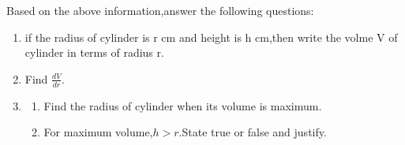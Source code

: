\documentclass{article}
\begin{document}
\begin{enumerate}
		Based on the above information,answer the following questions:\\
		
			\begin{enumerate}
				\item if the radius of cylinder is r cm and height is h cm,then write the volme V of cylinder in terms of radius r.
					
				\item Find $ \frac{dV}{dr} $.
					
				\item \begin{enumerate}
						\item Find the radius of cylinder when its volume is maximum.
			
		\item For maximum volume,$h>r$.State true or false and justify.
				
			
				\end{enumerate}
			\end{enumerate}
\end{enumerate}
\end{document}
